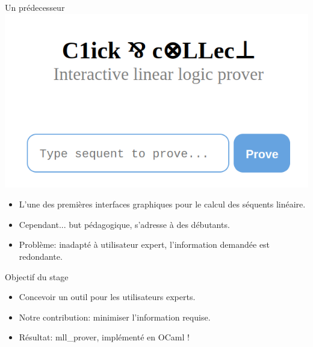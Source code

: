 \documentclass{beamer}
\begin{document}
\begin{frame}{Un prédecesseur}
    \centering
    \includegraphics[scale=0.35]{Click_and_collect.png}

    \pause
    
    \begin{itemize}
        \item L'une des premières interfaces graphiques pour le calcul des séquents linéaire.
            \pause
        \item Cependant... \pause but pédagogique, s'adresse à des débutants.
            \pause
        \item Problème: \pause inadapté à utilisateur expert, \pause l'information demandée est redondante.
    \end{itemize}


\end{frame}

\begin{frame}{Objectif du stage}
    \begin{itemize}
        \item Concevoir un outil pour les utilisateurs experts.
            \pause
        \item Notre contribution: \pause minimiser l'information requise.
            \pause
        \item Résultat: \pause mll\_prover, implémenté en OCaml !
    \end{itemize}
\end{frame}
\end{document}
